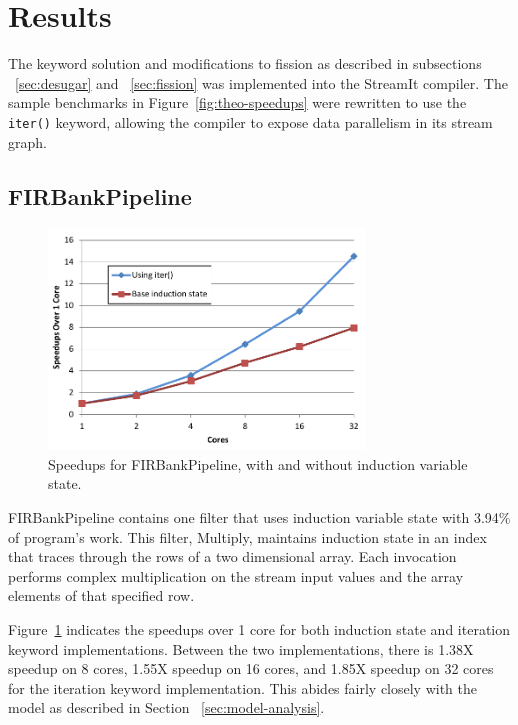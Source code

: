 \section{Results}
\label{sec:analysis}

The keyword solution and modifications to fission as described in subsections ~\ref{sec:desugar} and ~\ref{sec:fission} was implemented into the StreamIt compiler.  The sample benchmarks in Figure~\ref{fig:theo-speedups} were rewritten to use the {\tt iter()} keyword, allowing the compiler to expose data parallelism in its stream graph.


\subsection{FIRBankPipeline}
\begin{figure}[t]
\includegraphics[width=3.3in]{figures/firbank-results.pdf}
\caption{Speedups for FIRBankPipeline, with and without induction variable state.  \protect\label{fig:firbank-results}}
\end{figure}

FIRBankPipeline contains one filter that uses induction variable state with 3.94\% of program's work.  This filter, Multiply, maintains induction state in an index that traces through the rows of a two dimensional array.  Each invocation performs complex multiplication on the stream input values and the array elements of that specified row.  

Figure~\ref{fig:firbank-results} indicates the speedups over 1 core for both induction state and iteration keyword implementations.  Between the two implementations, there is 1.38X speedup on 8 cores, 1.55X speedup on 16 cores, and 1.85X speedup on 32 cores for the iteration keyword implementation.  This abides fairly closely with the model as described in Section ~\ref{sec:model-analysis}.  